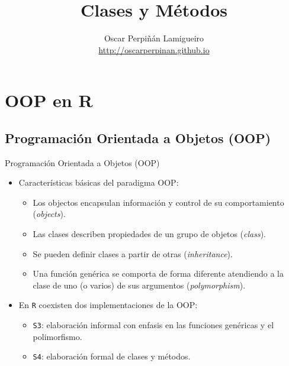 \documentclass[xcolor={usenames,svgnames,dvipsnames}]{beamer}
\author{Oscar Perpiñán Lamigueiro \\ \url{http://oscarperpinan.github.io}}
\date{}
\title{Clases y Métodos}
\begin{document}
\maketitle

\section{OOP en R}
\label{sec:org4bdff1c}
\subsection{Programación Orientada a Objetos (OOP)}
\label{sec:orgac99cee}

\begin{frame}[label={sec:org85b2a01},fragile]{Programación Orientada a Objetos (OOP)}
 \begin{itemize}
\item Características básicas del paradigma OOP:
\begin{itemize}
\item Los objectos encapsulan información y control de su comportamiento (\emph{objects}).
\item Las clases describen propiedades de un grupo de objetos (\emph{class}).
\item Se pueden definir clases a partir de otras (\emph{inheritance}).
\item Una función genérica se comporta de forma diferente atendiendo a la
clase de uno (o varios) de sus argumentos (\emph{polymorphism}).
\end{itemize}
\item En \texttt{R} coexisten dos implementaciones de la OOP:
\begin{itemize}
\item \texttt{S3}: elaboración informal con enfasis en las funciones genéricas y el polimorfismo.
\item \texttt{S4}: elaboración formal de clases y métodos.
\end{itemize}
\end{itemize}
\end{frame}
\end{document}
